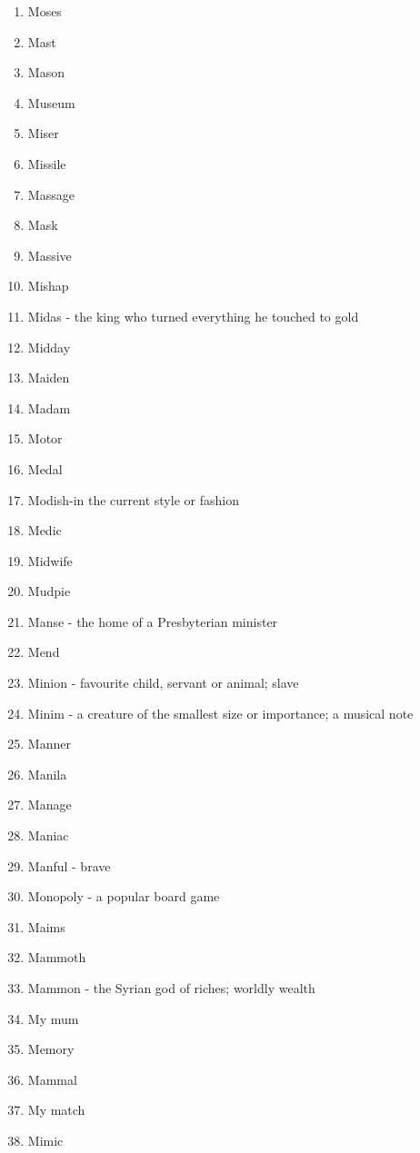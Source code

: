 \begin{enumerate}
        \item Moses
        \item Mast
        \item Mason
        \item Museum
        \item Miser
        \item Missile
        \item Massage
        \item Mask
        \item Massive
        \item Mishap
        \item Midas - the king who turned everything he touched to gold
        \item Midday
        \item Maiden
        \item Madam
        \item Motor
        \item Medal
        \item Modish-in the current style or fashion
        \item Medic
        \item Midwife
        \item Mudpie
        \item Manse - the home of a Presbyterian minister
        \item Mend
        \item Minion - favourite child, servant or animal; slave
        \item Minim - a creature of the smallest size or importance; a musical note
        \item Manner
        \item Manila
        \item Manage
        \item Maniac
        \item Manful - brave
        \item Monopoly - a popular board game
        \item Maims
        \item Mammoth
        \item Mammon - the Syrian god of riches; worldly wealth
        \item My mum
        \item Memory
        \item Mammal
        \item My match
        \item Mimic

\end{enumerate}
